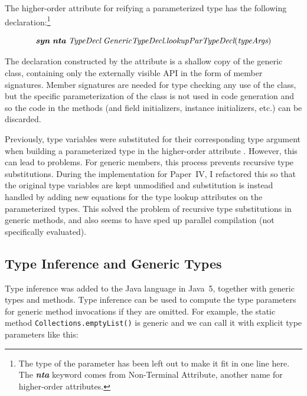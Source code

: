 \documentclass[10pt, twoside, openright]{book}
\begin{document}
The higher-order attribute for reifying a parameterized type has the following declaration:\footnote{%
The type of the parameter has been left out to make it fit in one line here.
The \textbf{\textit{nta}} keyword comes from Non-Terminal Attribute, another name
for higher-order attributes.}


\begin{equation*}
\textbf{\textit{syn}} \; \textbf{\textit{nta}} \; \textit{TypeDecl} \; \textit{GenericTypeDecl}.\textit{lookupParTypeDecl}(\textit{typeArgs})
\end{equation*}

\noindent
The declaration constructed by the attribute is a shallow copy of the generic class, containing
only the externally visible API in the form of member signatures.
Member signatures are
needed for type checking any use of the class, but the specific parameterization of the class
is not used in code generation and
so the code in the methods (and field initializers, instance initializers, etc.) can be discarded.

Previously, type variables were substituted for their corresponding type argument when building
a parameterized type in the higher-order attribute \cite{jastaddj}. %
However, this can lead to problems.
For generic members, this process prevents recursive type substitutions.
During the implementation for Paper~IV, I refactored this so that the original type variables
are kept unmodified and substitution is instead
handled by adding new equations for the type lookup attributes on the parameterized types.
This solved the problem of recursive type substitutions in generic methods, and also seems
to have sped up parallel compilation (not specifically evaluated).


\subsection{Type Inference and Generic Types}

Type inference was added to the Java language in Java~5, together with generic types and methods.
Type inference can be used to compute the type parameters for generic method invocations
if they are omitted. For example, the static method \texttt{Collections.emptyList()} is generic and
we can call it with explicit type parameters like this:
\end{document}
